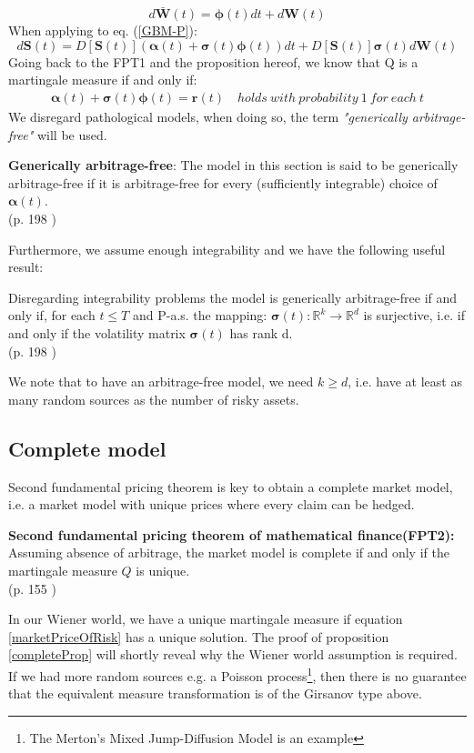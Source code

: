 $$d\bm{\bar{W}}(t)=\bm{\phi}(t)dt + d\bm{W}(t)$$
When applying to eq. (\ref{GBM-P}):
$$d\bm{S}(t)=D[\bm{S}(t)](\bm{\alpha}(t)+\bm{\sigma}(t)\bm{\phi}(t))dt+D[\bm{S}(t)]\bm{\sigma}(t)d\bm{W}(t)$$
Going back to the FPT1 and the proposition hereof, we know that Q is a martingale measure if and only if:
\begin{align}\label{marketPriceOfRisk}
\bm{\alpha}(t)+\bm{\sigma}(t)\bm{\phi}(t)=\textbf{r}(t) \quad holds \ with \ probability \ 1 \ for \ each \ t
\end{align}
We disregard pathological models, when doing so, the term \textsl{"generically arbitrage-free"} will be used. 

\theoremstyle{definition}
\begin{definition}{\textbf{Generically arbitrage-free}:}
The model in this section is said to be generically arbitrage-free if it is arbitrage-free for every (sufficiently integrable) choice of $\bm{\alpha}(t)$.
\\ \null \hfill (p. 198 \parencite{finKont})
\end{definition}

Furthermore, we assume enough integrability and we have the following useful result:
\theoremstyle{proposition}
\begin{proposition}{}\label{arbitrageFreeProp}
Disregarding integrability problems the model is generically arbitrage-free if and only if, for each $t\leq T$ and P-a.s. the mapping:
$\bm{\sigma}(t):\mathbb{R}^k \to \mathbb{R}^d$ is surjective, i.e. if and only if the volatility matrix $\bm{\sigma}(t)$ has rank d.
\\ \null \hfill(p. 198 \parencite{finKont})
\end{proposition}
We note that to have an arbitrage-free model, we need $k\geq d$, i.e. have at least as many random sources as the number of risky assets. 

\subsection{Complete model}
Second fundamental pricing theorem is key to obtain a complete market model, i.e. a market model with unique prices where every claim can be hedged.
\begin{theorem}\label{FFT2}
\textbf{Second fundamental pricing theorem of mathematical finance(FPT2): } Assuming absence of arbitrage, the market model is complete if and only if the martingale measure $Q$ is unique.
\\ \null \hfill (p. 155 \parencite{finKont})
\end{theorem}
In our Wiener world, we have a unique martingale measure if equation \ref{marketPriceOfRisk} has a unique solution. The proof of proposition \ref{completeProp} will shortly reveal why the Wiener world assumption is required. If we had more random sources e.g. a Poisson process\footnote{The Merton's Mixed Jump-Diffusion Model is an example}, then there is no guarantee that the equivalent measure transformation is of the Girsanov type above. 


